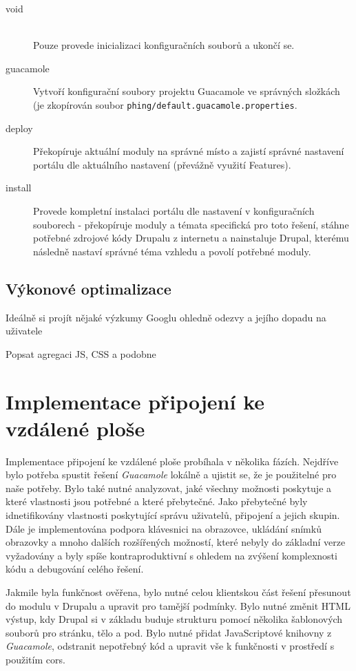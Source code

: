\begin{description}
  \item[void] \hfill \\
  Pouze provede inicializaci konfiguračních souborů a ukončí se.  
  \item[guacamole] 
  Vytvoří konfigurační soubory projektu Guacamole ve správných složkách (je zkopírován soubor \texttt{phing/default.guacamole.properties}.
  \item[deploy]
  Překopíruje aktuální moduly na správné místo a zajistí správné nastavení portálu dle aktuálního nastavení (převážně využití Features).
  \item[install]
  Provede kompletní instalaci portálu dle nastavení v konfiguračních souborech - překopíruje moduly a témata specifická pro toto řešení, stáhne potřebné zdrojové kódy Drupalu z internetu a nainstaluje Drupal, kterému následně nastaví správné téma vzhledu a povolí potřebné moduly.
\end{description}

\section{Výkonové optimalizace}
Ideálně si projít nějaké výzkumy Googlu ohledně odezvy a jejího dopadu na uživatele

Popsat agregaci JS, CSS a podobne 
\cite{website:drupal:optimizing}

\chapter{Implementace připojení ke vzdálené ploše}
\label{chap:implementace-guacamole}
Implementace připojení ke vzdálené ploše probíhala v několika fázích. Nejdříve bylo potřeba spustit řešení \emph{Guacamole} lokálně a ujistit se, že je použitelné pro naše potřeby. Bylo také nutné analyzovat, jaké všechny možnosti poskytuje a které vlastnosti jsou potřebné a které přebytečné. Jako přebytečné byly idnetifikovány vlastnosti poskytující správu uživatelů, připojení a jejich skupin. Dále je implementována podpora klávesnici na obrazovce, ukládání snímků obrazovky a mnoho dalších rozšířených možností, které nebyly do základní verze vyžadovány a byly spíše kontraproduktivní s ohledem na zvýšení komplexnosti kódu a debugování celého řešení. 

Jakmile byla funkčnost ověřena, bylo nutné celou klientskou část řešení přesunout do modulu v Drupalu a upravit pro tamější podmínky. Bylo nutné změnit HTML výstup, kdy Drupal si v základu buduje strukturu pomocí několika šablonových souborů pro stránku, tělo a pod. Bylo nutné přidat JavaScriptové knihovny z \emph{Guacamole}, odstranit nepotřebný kód a upravit vše k funkčnosti v prostředí s použitím \gls{cors}. 

